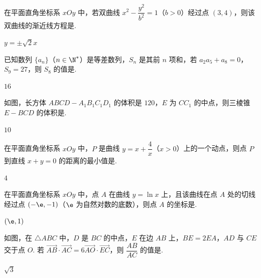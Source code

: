 \begin{problem}
在平面直角坐标系 \(xOy\) 中，若双曲线 \(x^2-\dfrac{y^2}{b^2}=1\)（\(b>0\)）经过点 \((3,4)\)，则该双曲线的渐近线方程是\fillinblank{}.

\begin{answer}
\(y=\pm\sqrt{2}x\)
\end{answer}
\end{problem}

\begin{problem}
已知数列 \(\{a_n\}\)（\(n\in\N^*\)）是等差数列，\(S_n\) 是其前 \(n\) 项和，若 \(a_2a_5+a_8=0\)，\(S_9=27\)，则 \(S_8\) 的值是\fillinblank{}.

\begin{answer}
\(16\)
\end{answer}
\end{problem}

\begin{problem}
如图，长方体 \(ABCD-A_1B_1C_1D_1\) 的体积是 \(120\)，\(E\) 为 \(CC_1\) 的中点，则三棱锥 \(E-BCD\) 的体积是\fillinblank{}.


\begin{answer}
\(10\)
\end{answer}
\end{problem}

\begin{problem}
在平面直角坐标系 \(xOy\) 中，\(P\) 是曲线 \(y=x+\dfrac4x\)（\(x>0\)）上的一个动点，则点 \(P\) 到直线 \(x+y=0\) 的距离的最小值是\fillinblank{}.

\begin{answer}
\(4\)
\end{answer}
\end{problem}

\begin{problem}
在平面直角坐标系 \(xOy\) 中，点 \(A\) 在曲线 \(y=\ln x\) 上，且该曲线在点 \(A\) 处的切线经过点 \((-\e,-1)\)（\(\e\) 为自然对数的底数），则点 \(A\) 的坐标是\fillinblank{}.

\begin{answer}
\((\e,1)\)
\end{answer}
\end{problem}

\begin{problem}
如图，在 \(\triangle ABC\) 中，\(D\) 是 \(BC\) 的中点，\(E\) 在边 \(AB\) 上，\(BE=2EA\)，\(AD\) 与 \(CE\) 交于点 \(O\). 若 \(\overrightarrow{AB}\cdot\overrightarrow{AC}=6\overrightarrow{AO}\cdot\overrightarrow{EC}\)，则 \(\dfrac{AB}{AC}\) 的值是\fillinblank{}.


\begin{answer}
\(\sqrt{3}\)
\end{answer}
\end{problem}

